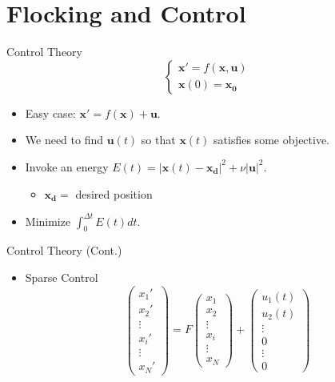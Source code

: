 \documentclass{beamer}
\begin{document}
\section{Flocking and Control}
\begin{frame}{Control Theory}
	\begin{equation*}
        \begin{cases}
        \bm{x}' = f(\bm{x},\bm{u})\\%
        \bm{x}(0) = \bm{x_0}
        \end{cases}
    \end{equation*}
    \begin{itemize}
    	\item Easy case: $\bm{x}' = f(\bm{x}) + \bm{u}$.
    	\item We need to find $\bm{u}(t)$ so that $\bm{x}(t)$ satisfies some objective.
        \item Invoke an energy $E(t) = |\bm{x}(t)-\bm{x_d}|^2 + \nu|\bm{u}|^2$.
        \begin{itemize}
        	\item $\bm{x_d} =$ desired position
        \end{itemize}
		\item Minimize $\int_{0}^{\Delta t}{E(t) dt}$.         
    \end{itemize}
\end{frame}
\begin{frame}{Control Theory (Cont.)}
	\begin{itemize}
    	\item Sparse Control
        $$\left( \begin{array}{ccc}
			x_1'   \\  x_2' \\ \vdots \\ x_i' \\ \vdots   \\ x_N' 
            \end{array} \right) 
            = F \left( \begin{array}{ccc}
            x_1 \\ x_2 \\ \vdots \\ x_i \\ \vdots \\x_N 
            \end{array} \right) 
            + \left( \begin{array}{ccc}
            u_1(t) \\ u_2(t) \\ \vdots \\ 0 \\ \vdots \\ 0 
            \end{array} \right)
            $$
    \end{itemize}
\end{frame}
\end{document}
